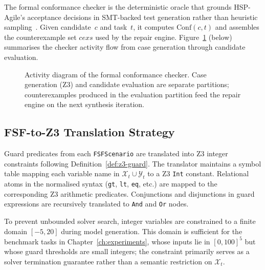 The formal conformance checker is the deterministic oracle that grounds
HSP-Agile's acceptance decisions in SMT-backed test generation rather than
heuristic sampling~\citep{claessen2000quickcheck}.  Given candidate~$c$ and
task~$t$, it computes $\mathrm{Conf}(c,t)$ and assembles the counterexample
set $\mathit{cexs}$ used by the repair engine.
Figure~\ref{fig:checker-activity} (below) summarises the checker activity flow
from case generation through candidate evaluation.

\begin{figure}[t]
  \centering
  \caption{Activity diagram of the formal conformance checker.  Case
           generation (Z3) and candidate evaluation are separate partitions;
           counterexamples produced in the evaluation partition feed the
           repair engine on the next synthesis iteration.}
  \label{fig:checker-activity}
\end{figure}

\subsection{FSF-to-Z3 Translation Strategy}

Guard predicates from each \texttt{FSFScenario} are translated into Z3
integer constraints following Definition~\ref{def:z3-guard}.  The translator
maintains a symbol table mapping each variable name in $\mathcal{X}_t \cup
\mathcal{Y}_t$ to a Z3 \texttt{Int} constant.  Relational atoms in the
normalised syntax (\texttt{gt}, \texttt{lt}, \texttt{eq}, etc.) are mapped
to the corresponding Z3 arithmetic predicates.  Conjunctions and disjunctions
in guard expressions are recursively translated to \texttt{And} and
\texttt{Or} nodes.

To prevent unbounded solver search, integer variables are constrained to a
finite domain $[-5, 20]$ during model generation.  This domain is sufficient
for the benchmark tasks in Chapter~\ref{ch:experiments}, whose inputs lie in
$[0, 100]^5$ but whose guard thresholds are small integers; the constraint
primarily serves as a solver termination guarantee rather than a semantic
restriction on $\mathcal{X}_t$.

